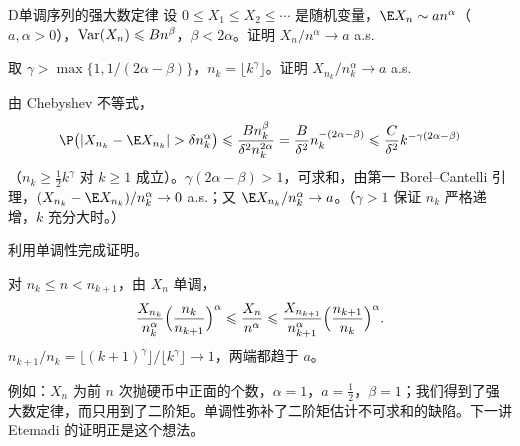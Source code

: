 \thinkingpart

\begin{probleme}[问题]{D}{单调序列的强大数定律}
设 $0\leqslant X_1\leqslant X_2\leqslant\cdots$ 是随机变量，$\E X_n\sim an^\alpha$（$a,\alpha>0$），$\operatorname{Var}(X_n)\leqslant Bn^\beta$，$\beta<2\alpha$。证明 $X_n/n^\alpha\to a$ a.s.
\begin{questions}
\item 取 $\gamma>\max\{1,1/(2\alpha-\beta)\}$，$n_k=\lfloor k^\gamma\rfloor$。证明 $X_{n_k}/n_k^\alpha\to a$ a.s.
\begin{solution}
由 Chebyshev 不等式，
\[
\P\bigl(\abs{X_{n_k}-\E X_{n_k}}>\delta n_k^\alpha\bigr)\leqslant\frac{Bn_k^\beta}{\delta^2n_k^{2\alpha}}=\frac B{\delta^2}n_k^{-(2\alpha-\beta)}\leqslant\frac{C}{\delta^2}k^{-\gamma(2\alpha-\beta)}
\]
（$n_k\geqslant\frac12k^\gamma$ 对 $k\geqslant1$ 成立）。$\gamma(2\alpha-\beta)>1$，可求和，由第一 Borel--Cantelli 引理，$(X_{n_k}-\E X_{n_k})/n_k^\alpha\to0$ a.s.；又 $\E X_{n_k}/n_k^\alpha\to a$。（$\gamma>1$ 保证 $n_k$ 严格递增，$k$ 充分大时。）
\end{solution}
\item 利用单调性完成证明。
\begin{solution}
对 $n_k\leqslant n<n_{k+1}$，由 $X_n$ 单调，
\[
\frac{X_{n_k}}{n_k^\alpha}\Bigl(\frac{n_k}{n_{k+1}}\Bigr)^\alpha\leqslant\frac{X_n}{n^\alpha}\leqslant\frac{X_{n_{k+1}}}{n_{k+1}^\alpha}\Bigl(\frac{n_{k+1}}{n_k}\Bigr)^\alpha .
\]
$n_{k+1}/n_k=\lfloor(k+1)^\gamma\rfloor/\lfloor k^\gamma\rfloor\to1$，两端都趋于 $a$。

例如：$X_n$ 为前 $n$ 次抛硬币中正面的个数，$\alpha=1$，$a=\frac12$，$\beta=1$；我们得到了强大数定律，而只用到了二阶矩。单调性弥补了二阶矩估计不可求和的缺陷。下一讲 Etemadi 的证明正是这个想法。
\end{solution}
\end{questions}
\end{probleme}


